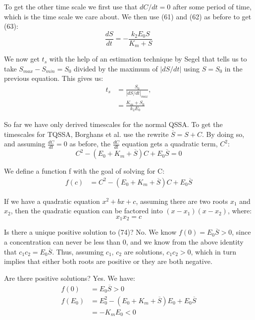 \documentclass[12pt]{article}
\begin{document}
To get the other time scale we first use that $dC/dt = 0$ after some
period of time, which is the time scale we care about. We then use
(61) and (62) as before to get (63):
\begin{equation}
  \frac{dS}{dt} = -\frac{k_2 E_0 S}{K_m + S}
\end{equation}

We now get $t_s$ with the help of an estimation technique by Segel
\cite{segel1984modeling} that tells us to take
$S_{max} - S_{min} = S_0$ divided by the maximum of
$|dS/dt|$ using $S=S_0$ in the previous equation. This gives us:
\begin{align}
  t_s &= \frac{S_0}{|dS/dt|_{max}}, \\
      &= \frac{K_m + S_0}{k_2 E_0}
\end{align}

So far we have only derived timescales for the normal QSSA. To get the
timescales for TQSSA, Borghans et al. use the rewrite
$\overline{S} = S + C$. By doing so, and assuming $\frac{dC}{dt}=0$ as
before, the $\frac{dC}{dt}$ equation gets a quadratic term, $C^2$:
\begin{equation}
  C^2 - (E_0 + K_m + \overline{S})C + E_0 \overline{S} = 0
\end{equation}

We define a function f with the goal of solving for C:
\begin{align}
  f(c) &= C^2 - (E_0 + K_m + \overline{S})C + E_0 \overline{S}
\end{align}

If we have a quadratic equation $x^2+bx+c$, assuming there are two
roots $x_1$ and $x_2$, then the quadratic equation can be factored
into $(x - x_1)(x - x_2)$, where:
\begin{equation}
  x_1 x_2 = c
\end{equation}

Is there a unique positive solution to (74)? No. We know $f(0) = E_0
\overline{S} > 0$, since a concentration can never be less than 0, and
we know from the above identity that $c_1 c_2 = E_0
\overline{S}$. Thus, assuming $c_1$, $c_2$ are solutions, $c_1 c_2 >
0$, which in turn implies that either both roots are positive or they
are both negative.

Are there positive solutions? Yes. We have:
\begin{align}
  f(0) &= E_0 \overline{S} > 0 \\
  f(E_0) &= E_0^2 - (E_0 + K_m + \overline{S})E_0 + E_0 \overline{S} \\
         &= - K_m E_0 < 0
\end{align}
\end{document}
